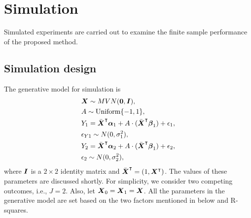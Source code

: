 \section{Simulation}
%

 Simulated experiments are carried out to examine the finite sample performance of the proposed method. 
\subsection{Simulation design}
The generative model for simulation is 
\begin{equation*}
\begin{aligned}
& \boldsymbol{X} \sim MVN(\boldsymbol{0}, \boldsymbol{I}),\\
& A \sim \text{Uniform}\{ -1, 1\}, \\
& Y_1 =  \bar{\boldsymbol{X}}^{\intercal}\boldsymbol{\alpha}_{1} + A \cdot (\bar{\boldsymbol{X}}^{\intercal}\boldsymbol{\beta}_{1}) + \epsilon_{1}, \\
& \epsilon_{Y1} \sim N(0, \sigma^{2}_{1}), \\
& Y_2 = \bar{\boldsymbol{X}}^{\intercal}\boldsymbol{\alpha}_{2} + A\cdot(\bar{\boldsymbol{X}}^{\intercal}\boldsymbol{\beta}_{1}) + \epsilon_{2}, \\
& \epsilon_2 \sim N(0, \sigma^{2}_2),
\end{aligned}
\end{equation*}
where $\boldsymbol{I}$ is a $2\times2$ identity matrix and $\bar{\boldsymbol{X}}^{\intercal} = (1, \boldsymbol{X}^{\intercal})$. The values of these parameters are discussed shortly. For simplicity, we consider two competing outcomes, i.e., $J=2$. Also, let $\boldsymbol{X}_0 = \boldsymbol{X}_1 = \boldsymbol{X}$. 
All the parameters in the generative model are set based on the two factors mentioned in below and R-squares.\\

